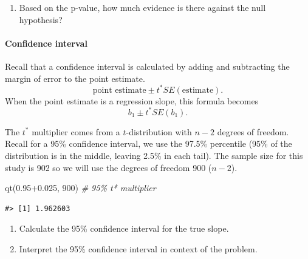 \documentclass[
]{report}
\newenvironment{Shaded}{\begin{snugshade}}{\end{snugshade}}
\newcommand{\CommentTok}[1]{\textcolor[rgb]{0.56,0.35,0.01}{\textit{#1}}}
\newcommand{\DecValTok}[1]{\textcolor[rgb]{0.00,0.00,0.81}{#1}}
\newcommand{\FloatTok}[1]{\textcolor[rgb]{0.00,0.00,0.81}{#1}}
\newcommand{\FunctionTok}[1]{\textcolor[rgb]{0.00,0.00,0.00}{#1}}
\newcommand{\NormalTok}[1]{#1}
\providecommand{\tightlist}{%
  \setlength{\itemsep}{0pt}\setlength{\parskip}{0pt}}
\begin{document}
\vspace{0.5in}

\begin{enumerate}
\def\labelenumi{\arabic{enumi}.}
\setcounter{enumi}{14}
\tightlist
\item
  Based on the p-value, how much evidence is there against the null hypothesis?
\end{enumerate}

\vspace{0.5in}

\hypertarget{confidence-interval-4}{%
\paragraph*{Confidence interval}\label{confidence-interval-4}}

Recall that a confidence interval is calculated by adding and subtracting the margin of error to the point estimate.\\
\[\mbox{point estimate}\pm t^*SE(\mbox{estimate}).\]
When the point estimate is a regression slope, this formula becomes
\[b_1 \pm t^* SE(b_1).\]

The \(t^*\) multiplier comes from a \(t\)-distribution with \(n-2\) degrees of freedom. Recall for a 95\% confidence interval, we use the 97.5\% percentile (95\% of the distribution is in the middle, leaving 2.5\% in each tail). The sample size for this study is 902 so we will use the degrees of freedom 900 (\(n-2\)).

\begin{Shaded}
\begin{Highlighting}[]
\FunctionTok{qt}\NormalTok{(}\FloatTok{0.95+0.025}\NormalTok{, }\DecValTok{900}\NormalTok{) }\CommentTok{\# 95\% t* multiplier }
\end{Highlighting}
\end{Shaded}

\begin{verbatim}
#> [1] 1.962603
\end{verbatim}

\begin{enumerate}
\def\labelenumi{\arabic{enumi}.}
\setcounter{enumi}{15}
\item
  Calculate the 95\% confidence interval for the true slope.
  \vspace{0.8in}
\item
  Interpret the 95\% confidence interval in context of the problem.
\end{enumerate}
\end{document}
